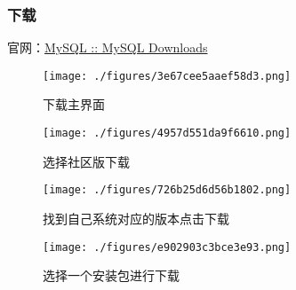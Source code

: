 \subsubsection{下载}
官网：\href{https://www.mysql.com/downloads/}{MySQL :: MySQL Downloads}
\begin{figure}[ht]
\centering
\texttt{[image: ./figures/3e67cee5aaef58d3.png]}
\caption{下载主界面} \label{fig_DBS001_3}
\end{figure}

\begin{figure}[ht]
\centering
\texttt{[image: ./figures/4957d551da9f6610.png]}
\caption{选择社区版下载} \label{fig_DBS001_4}
\end{figure}

\begin{figure}[ht]
\centering
\texttt{[image: ./figures/726b25d6d56b1802.png]}
\caption{找到自己系统对应的版本点击下载} \label{fig_DBS001_5}
\end{figure}

\begin{figure}[ht]
\centering
\texttt{[image: ./figures/e902903c3bce3e93.png]}
\caption{选择一个安装包进行下载} \label{fig_DBS001_6}
\end{figure}
